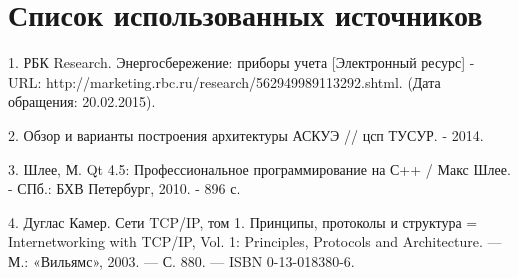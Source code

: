 


 
 
 \newpage
 \tableofcontents
 
 
 
 
 
 
 
 \newpage
 
 
 
 \newpage
 \section*{Список использованных источников}
 1. РБК Research. Энергосбережение: приборы учета [Электронный ресурс] - URL: http://marketing.rbc.ru/research/562949989113292.shtml. (Дата обращения: 20.02.2015).
 
 2. Обзор и варианты построения архитектуры АСКУЭ // цсп ТУСУР. - 2014.
 
 3. Шлее, М. Qt 4.5: Профессиональное программирование на С++ / Макс Шлее. - СПб.: БХВ Петербург, 2010. - 896 с.
 
 4. Дуглас Камер. Сети TCP/IP, том 1. Принципы, протоколы и структура = Internetworking with TCP/IP, Vol. 1: Principles, Protocols and Architecture. — М.: «Вильямс», 2003. — С. 880. — ISBN 0-13-018380-6.


